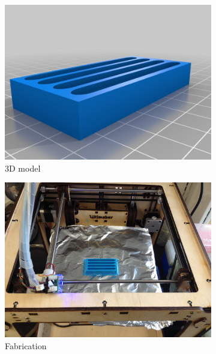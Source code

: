 \documentclass[fleqn,10pt]{wlpeerj}
\begin{document}
\begin{figure}
    \centering
        \begin{subfigure}[b]{0.24\textwidth}
        \centering
        \includegraphics[width=\textwidth]{Fig4a}
        \caption{3D model}
        \label{fig:swim_plate_0}
    \end{subfigure}
    \hfill
    \begin{subfigure}[b]{0.24\textwidth}
        \centering
        \includegraphics[width=\textwidth]{Fig4b}
        \caption{Fabrication}
        \label{fig:swim_plate_1}
    \end{subfigure}
    \hfill
    \begin{subfigure}[b]{0.24\textwidth}
        \centering

\end{subfigure}
\end{figure}
\end{document}
